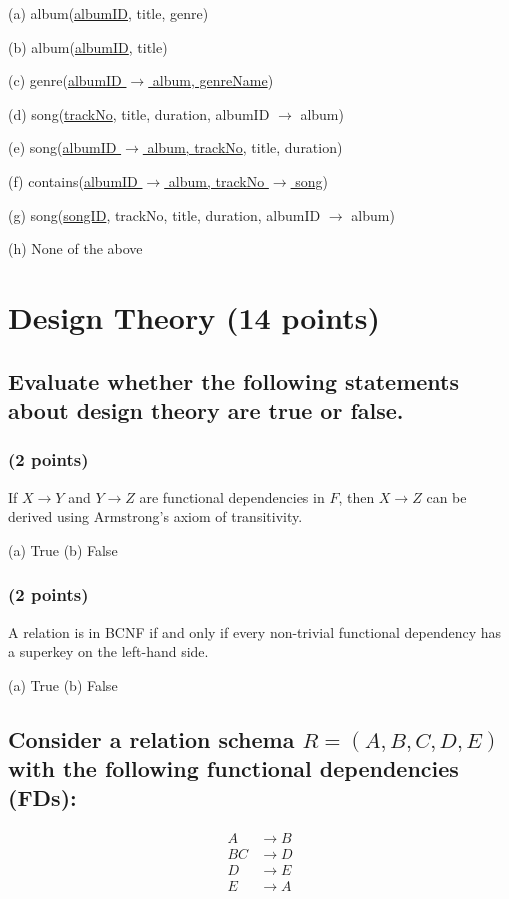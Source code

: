 \documentclass[11pt,a4paper]{article}
\begin{document}
(a) album(\underline{albumID}, title, genre)

(b) album(\underline{albumID}, title)

(c) genre(\underline{albumID $\rightarrow$ album, genreName})

(d) song(\underline{trackNo}, title, duration, albumID $\rightarrow$ album)

(e) song(\underline{albumID $\rightarrow$ album, trackNo}, title, duration)

(f) contains(\underline{albumID $\rightarrow$ album, trackNo $\rightarrow$ song})

(g) song(\underline{songID}, trackNo, title, duration, albumID $\rightarrow$ album)

(h) None of the above

\newpage

\section{Design Theory (14 points)}

\subsection{Evaluate whether the following statements about design theory are true or false.}

\subsubsection{(2 points)}
If $X \rightarrow Y$ and $Y \rightarrow Z$ are functional dependencies in $F$, then $X \rightarrow Z$ can be derived using Armstrong's axiom of transitivity.

(a) True \quad\quad (b) False

\subsubsection{(2 points)}
A relation is in BCNF if and only if every non-trivial functional dependency has a superkey on the left-hand side.

(a) True \quad\quad (b) False

\subsection{Consider a relation schema $R = (A, B, C, D, E)$ with the following functional dependencies (FDs):}

\begin{align*}
A &\rightarrow B \\
BC &\rightarrow D \\
D &\rightarrow E \\
E &\rightarrow A
\end{align*}
\end{document}
